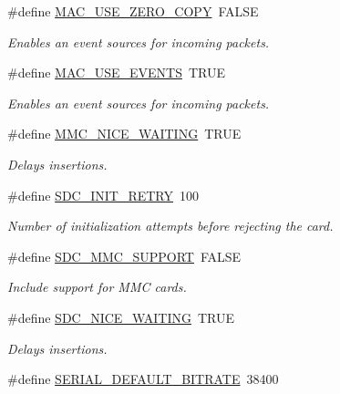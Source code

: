 \begin{DoxyCompactItemize}
\#define \hyperlink{group__HAL__CONF_gad763d9426413cf2fe3922ebb8578bc59}{M\+A\+C\+\_\+\+U\+S\+E\+\_\+\+Z\+E\+R\+O\+\_\+\+C\+O\+PY}~F\+A\+L\+SE
\begin{DoxyCompactList}\small\item\em Enables an event sources for incoming packets. \end{DoxyCompactList}\item 
\hypertarget{group__HAL__CONF_ga887da1c1383a9e7b45c4464877a7e05e}{}\label{group__HAL__CONF_ga887da1c1383a9e7b45c4464877a7e05e} 
\#define \hyperlink{group__HAL__CONF_ga887da1c1383a9e7b45c4464877a7e05e}{M\+A\+C\+\_\+\+U\+S\+E\+\_\+\+E\+V\+E\+N\+TS}~T\+R\+UE
\begin{DoxyCompactList}\small\item\em Enables an event sources for incoming packets. \end{DoxyCompactList}\item 
\#define \hyperlink{group__HAL__CONF_ga3087dfffa81dd8a0a80ee92746e65fe2}{M\+M\+C\+\_\+\+N\+I\+C\+E\+\_\+\+W\+A\+I\+T\+I\+NG}~T\+R\+UE
\begin{DoxyCompactList}\small\item\em Delays insertions. \end{DoxyCompactList}\item 
\#define \hyperlink{group__HAL__CONF_ga8d39f0c9799062f0698d97c26e6fa42d}{S\+D\+C\+\_\+\+I\+N\+I\+T\+\_\+\+R\+E\+T\+RY}~100
\begin{DoxyCompactList}\small\item\em Number of initialization attempts before rejecting the card. \end{DoxyCompactList}\item 
\#define \hyperlink{group__HAL__CONF_ga4f938eff7370feb8de8411e255d21b01}{S\+D\+C\+\_\+\+M\+M\+C\+\_\+\+S\+U\+P\+P\+O\+RT}~F\+A\+L\+SE
\begin{DoxyCompactList}\small\item\em Include support for M\+MC cards. \end{DoxyCompactList}\item 
\#define \hyperlink{group__HAL__CONF_ga3391c832c171a8606b0fc864766f08ba}{S\+D\+C\+\_\+\+N\+I\+C\+E\+\_\+\+W\+A\+I\+T\+I\+NG}~T\+R\+UE
\begin{DoxyCompactList}\small\item\em Delays insertions. \end{DoxyCompactList}\item 
\#define \hyperlink{group__HAL__CONF_gacb4c08ac23f83ac9d58c50ff840de516}{S\+E\+R\+I\+A\+L\+\_\+\+D\+E\+F\+A\+U\+L\+T\+\_\+\+B\+I\+T\+R\+A\+TE}~38400

\end{DoxyCompactItemize}
